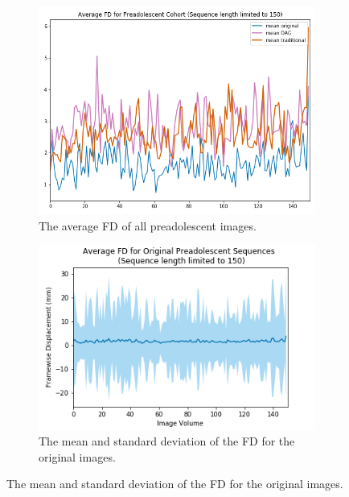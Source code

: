 \begin{figure}[t]
	\centering
	\begin{subfigure}{0.45\textwidth}
		\centering
		\includegraphics[width=1\textwidth]{6/figures/pread_fd_all_150_avg.png}
		\caption{The average FD of all preadolescent images.}
	\end{subfigure}%
	\vspace{0.05\textwidth}
	\begin{subfigure}{0.45\textwidth}
		\centering
		\includegraphics[width=1\textwidth]{6/figures/pread-bold-fd-150.png}
		\caption{The mean and standard deviation of the FD for the original images.}
	\end{subfigure}
	

\end{figure}

